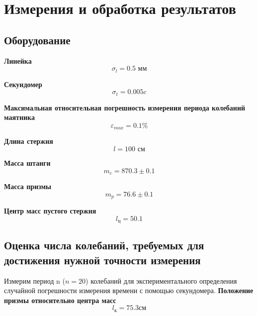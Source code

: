 \documentclass[a4paper,12pt]{article} %
\begin{document}
\section{Измерения и обработка результатов}
\subsection{Оборудование}
\textbf{Линейка}
\begin{equation}
\sigma_l = 0.5 \text{ мм}
\end{equation}

\textbf{Секундомер}
\begin{equation}
\sigma_t = 0.005  c
\end{equation}


\textbf{Максимальная относительная погрешность измерения периода колебаний маятника}
\begin{equation}
\varepsilon_{max} = 0.1 \%
\end{equation}

\textbf{Длина стержня}
\begin{equation}
l =100 \text{ см} 
\end{equation}

\textbf{Масса штанги}
\begin{equation}
m_{c} =870.3 \pm 0.1 
\end{equation}

\textbf{Масса призмы}
\begin{equation}
m_p =76.6 \pm 0.1 
\end{equation}

\textbf{Центр масс пустого стержня}
\begin{equation}
l_\text{ц} =50.1 
\end{equation}


\subsection{Оценка числа колебаний, требуемых для достижения нужной точности измерения}
Измерим период n  ($ n = 20$) колебаний  для экспериментального определения
случайной погрешности измерения времени с помощью секундомера.
\textbf{Положение призмы относительно центра масс}
\begin{equation}
l_{к} =75.3 \text{см} 
\end{equation}
\end{document}
